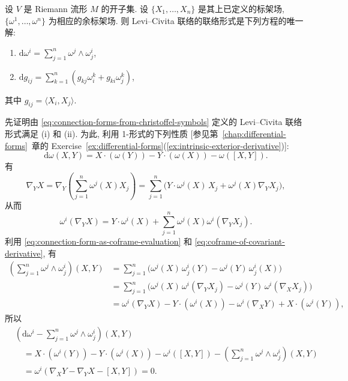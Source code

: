 \begin{RiemannTheorem}[Cartan]\label{thm:cartan-equations-for-levi-civita-connection}
设 $V$ 是 Riemann 流形 $M$ 的开子集. 设 $\{X_1,\ldots,X_n\}$ 是其上已定义的标架场, $\{\omega^1,\ldots,\omega^n\}$ 为相应的余标架场. 则 Levi–Civita 联络的联络形式是下列方程的唯一解:
\begin{enumerate}[label=(\roman*),leftmargin=*]
\item $\mathrm{d}\omega^i=\sum_{j=1}^n\omega^j\wedge\omega^i_j$,
\item $\mathrm{d}g_{ij}=\sum_{k=1}^n(g_{kj}\omega^k_i+g_{ki}\omega^k_j)$,
\end{enumerate}
其中 $g_{ij}=\langle X_i,X_j\rangle$.
\end{RiemannTheorem}

\begin{RiemannProof}
先证明由 \eqref{eq:connection-forms-from-christoffel-symbols} 定义的 Levi–Civita 联络形式满足 (i) 和 (ii). 为此, 利用 1-形式的下列性质 [参见第~\ref{chap:differential-forms}~章的 Exercise~\ref{ex:differential-forms}(\ref{ex:intrinsic-exterior-derivative})]:
\[
  \mathrm{d}\omega(X,Y)=X\cdot(\omega(Y))-Y\cdot(\omega(X))-\omega([X,Y]).
\]
有
\[
  \nabla_YX=\nabla_Y\left(\sum_{j=1}^n\omega^j(X)X_j\right)
  =\sum_{j=1}^n\bigl(Y\cdot\omega^j(X)\,X_j+\omega^j(X)\nabla_YX_j\bigr),
\]
从而
\begin{equation}\label{eq:coframe-of-covariant-derivative}
  \omega^i(\nabla_YX)=Y\cdot\omega^i(X)+\sum_{j=1}^n\omega^j(X)\omega^i(\nabla_YX_j).
\end{equation}
利用 \eqref{eq:connection-form-as-coframe-evaluation} 和 \eqref{eq:coframe-of-covariant-derivative}, 有
\begin{align*}
  \left(\sum_{j=1}^n\omega^j\wedge\omega^i_j\right)(X,Y)
  &=\sum_{j=1}^n\bigl(\omega^j(X)\,\omega^i_j(Y)-\omega^j(Y)\,\omega^i_j(X)\bigr)\\
  &=\sum_{j=1}^n\bigl(\omega^j(X)\,\omega^i(\nabla_YX_j)-\omega^j(Y)\,\omega^i(\nabla_XX_j)\bigr)\\
  &=\omega^i(\nabla_YX)-Y\cdot(\omega^i(X))-\omega^i(\nabla_XY)+X\cdot(\omega^i(Y)),
\end{align*}
所以
\begin{align*}
  &\left(\mathrm{d}\omega^i-\sum_{j=1}^n\omega^j\wedge\omega^i_j\right)(X,Y)\\
  &\quad=X\cdot(\omega^i(Y))-Y\cdot(\omega^i(X))-\omega^i([X,Y])
  -\left(\sum_{j=1}^n\omega^j\wedge\omega^i_j\right)(X,Y)\\
  &\quad=\omega^i(\nabla_XY-\nabla_YX-[X,Y])=0.

\end{align*}
\end{RiemannProof}
